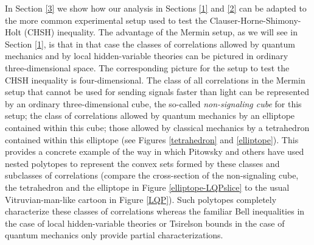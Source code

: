 In Section \ref{3} we show how our analysis in Sections \ref{1} and \ref{2} can be adapted to the more common experimental setup used to test the Clauser-Horne-Shimony-Holt (CHSH) inequality. The advantage of the Mermin setup, as we will see in Section \ref{1}, is that in that case the classes of correlations allowed by quantum mechanics and by local hidden-variable theories can be pictured in ordinary three-dimensional space. The corresponding picture for the setup to test the CHSH inequality is four-dimensional. The class of all correlations in the Mermin setup that cannot be used for sending signals faster than light can be represented by an ordinary three-dimensional cube, the so-called \emph{non-signaling cube} for this setup; the class of correlations allowed by quantum mechanics by an elliptope contained within this cube; those allowed by classical mechanics by a tetrahedron contained within this elliptope (see Figures \ref{tetrahedron} and \ref{elliptope}). This provides a concrete example of the way in which Pitowsky and others have used nested polytopes to represent the convex sets formed by these classes and subclasses of correlations (compare the cross-section of the non-signaling cube, the tetrahedron and the elliptope in Figure \ref{elliptope-LQPslice} to the usual Vitruvian-man-like cartoon in Figure \ref{LQP}). Such polytopes completely characterize these classes of correlations whereas the familiar Bell inequalities in the case of local hidden-variable theories or Tsirelson bounds in the case of quantum mechanics only provide partial characterizations. 


